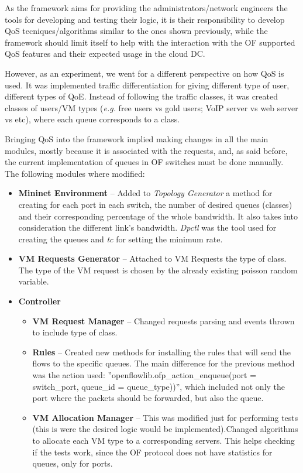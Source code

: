 \documentclass[12pt,english,oneside]{book}
\begin{document}
As the framework aims for providing the administrators/network engineers the tools for developing and testing their logic, it is their responsibility to develop QoS tecniques/algorithms similar to the ones shown previously, while the framework should limit itself to help with the interaction with the OF supported QoS features and their expected usage in the cloud DC.

However, as an experiment, we went for a different perspective on how QoS is used.
It was implemented traffic differentiation for giving different type of user, different types of QoE.
Instead of following the traffic classes, it was created classes of users/VM types (\textit{e.g.} free users vs gold users; VoIP server vs web server vs etc), where each queue corresponds to a class.

Bringing QoS into the framework implied making changes in all the main modules, mostly because it is associated with the requests, and, as said before, the current implementation of queues in OF switches must be done manually.
The following modules where modified:
\begin{itemize}
  \item \textbf{Mininet Environment} -- Added to \textit{Topology Generator} a method for creating for each port in each switch, the number of desired queues (classes) and their corresponding percentage of the whole bandwidth. It also takes into consideration the different link's bandwidth. \textit{Dpctl} was the tool used for creating the queues and \textit{tc} for setting the minimum rate.

  \item \textbf{VM Requests Generator} -- Attached to VM Requests the type of class. The type of the VM request is chosen by the already existing poisson random variable.

  \item \textbf{Controller}
  \begin{itemize}
    \item \textbf{VM Request Manager} -- Changed requests parsing and events thrown to include type of class.
    \item \textbf{Rules} -- Created new methods for installing the rules that will send the flows to the specific queues. The main difference for the previous method was the action used: ''openflowlib.ofp\_action\_enqueue(port = switch\_port, queue\_id = queue\_type))'', which included not only the port where the packets should be forwarded, but also the queue.

    \item \textbf{VM Allocation Manager} -- This was modified just for performing tests (this is were the desired logic would be implemented).Changed algorithms to allocate each VM type to a corresponding servers. This helps checking if the tests work, since the OF protocol does not have statistics for queues, only for ports.
  \end{itemize}
\end{itemize}
\end{document}
